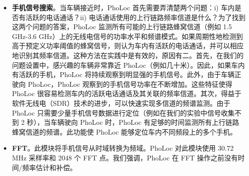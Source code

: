 \documentclass[journal, onecolumn]{IEEEtran}
\begin{document}
\begin{itemize}
    \item \textbf{手机信号搜索}。当车辆接近时，PhoLoc 首先需要弄清楚两个问题：i) 车内是否有活跃的电话通话？ii) 电话通话使用的上行链路频率信道是什么？为了找到这两个问题的答案，PhoLoc 监测所有可能的上行链路蜂窝信道（例如 1.5 GHz-3.6 GHz）上的无线电信号的功率水平和频谱模式。如果周期性地检测到高于预定义功率阈值的蜂窝信号，则认为车内有活跃的电话通话，并可以相应地识别其频率信道。这种方法在实践中是有效的，原因有二。首先，在我们的问题设置中，感兴趣的车辆非常靠近 PhoLoc（例如几十米）。因此，如果车内有活跃的手机，PhoLoc 将持续观察到明显强的手机信号。此外，由于车辆正驶向 PhoLoc，PhoLoc 观察到的手机信号功率在不断增加。这些特征使得 PhoLoc 很容易检测车内的活跃电话通话及其关联的频率信道。其次，得益于软件无线电（SDR）技术的进步，可以快速实现多信道的频谱监测。由于 PhoLoc 只需要少量手机信号数据进行定位（例如在我们的实验中信号收集不到 2 秒），当车辆驶向 PhoLoc 时，PhoLoc 有足够的时间监测所有上行链路蜂窝信道的频谱。此功能使 PhoLoc 能够定位车内不同频段上的多个手机。
    
    \item \textbf{FFT}。此模块将手机信号从时域转换为频域。PhoLoc 对此模块使用 30.72 MHz 采样率和 2048 个 FFT 点。我们强调，PhoLoc 在 FFT 操作之前没有时间/频率估计和补偿。
    

\end{itemize}
\end{document}
